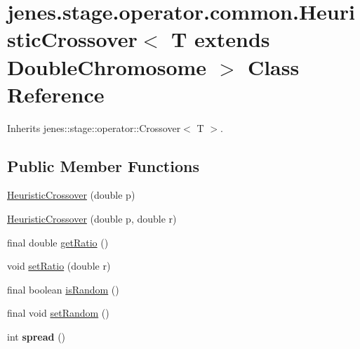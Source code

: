 \hypertarget{classjenes_1_1stage_1_1operator_1_1common_1_1_heuristic_crossover_3_01_t_01extends_01_double_chromosome_01_4}{
\section{jenes.stage.operator.common.HeuristicCrossover$<$ T extends DoubleChromosome $>$ Class Reference}
\label{classjenes_1_1stage_1_1operator_1_1common_1_1_heuristic_crossover_3_01_t_01extends_01_double_chromosome_01_4}
}
Inherits jenes::stage::operator::Crossover$<$ T $>$.

\subsection*{Public Member Functions}
\begin{CompactItemize}
\item 
\hyperlink{classjenes_1_1stage_1_1operator_1_1common_1_1_heuristic_crossover_3_01_t_01extends_01_double_chromosome_01_4_b1d3d3ec4281a97824e9859fddfba792}{HeuristicCrossover} (double p)
\item 
\hyperlink{classjenes_1_1stage_1_1operator_1_1common_1_1_heuristic_crossover_3_01_t_01extends_01_double_chromosome_01_4_45df3b701ffb650f013d3b65753f4ffa}{HeuristicCrossover} (double p, double r)
\item 
final double \hyperlink{classjenes_1_1stage_1_1operator_1_1common_1_1_heuristic_crossover_3_01_t_01extends_01_double_chromosome_01_4_cab7758424b5132b15579fff5da094d5}{getRatio} ()
\item 
void \hyperlink{classjenes_1_1stage_1_1operator_1_1common_1_1_heuristic_crossover_3_01_t_01extends_01_double_chromosome_01_4_dec77409f57afee4170cacb806e7254c}{setRatio} (double r)
\item 
final boolean \hyperlink{classjenes_1_1stage_1_1operator_1_1common_1_1_heuristic_crossover_3_01_t_01extends_01_double_chromosome_01_4_b965521456ce0233197659c9eb7f0e16}{isRandom} ()
\item 
final void \hyperlink{classjenes_1_1stage_1_1operator_1_1common_1_1_heuristic_crossover_3_01_t_01extends_01_double_chromosome_01_4_d3c86ba10d567679be7750185c955ef2}{setRandom} ()
\item 
\hypertarget{classjenes_1_1stage_1_1operator_1_1common_1_1_heuristic_crossover_3_01_t_01extends_01_double_chromosome_01_4_a2443a20ee35492f91c021f0b369354d}{
int \textbf{spread} ()}
\label{classjenes_1_1stage_1_1operator_1_1common_1_1_heuristic_crossover_3_01_t_01extends_01_double_chromosome_01_4_a2443a20ee35492f91c021f0b369354d}

\end{CompactItemize}
